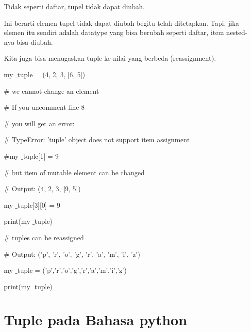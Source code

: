 Tidak seperti daftar, tupel tidak dapat diubah. \par
\vspace{12pt}
Ini berarti elemen tupel tidak dapat diubah begitu telah ditetapkan. Tapi, jika elemen itu sendiri adalah datatype yang bisa berubah seperti daftar, item nested-nya bisa diubah. \par
\vspace{12pt}
Kita juga bisa menugaskan tuple ke nilai yang berbeda (reassignment). \par
\vspace{12pt}
my $  \_  $tuple = (4, 2, 3, [6, 5]) \par
\vspace{12pt}
 $  \#  $ we cannot change an element \par
 $  \#  $ If you uncomment line 8 \par
 $  \#  $ you will get an error: \par
 $  \#  $ TypeError: 'tuple' object does not support item assignment \par
\vspace{12pt}
 $  \#  $my $  \_  $tuple[1] = 9 \par
\vspace{12pt}
 $  \#  $ but item of mutable element can be changed \par
 $  \#  $ Output: (4, 2, 3, [9, 5]) \par
my $  \_  $tuple[3][0] = 9 \par
print(my $  \_  $tuple) \par
\vspace{12pt}
 $  \#  $ tuples can be reassigned \par
 $  \#  $ Output: ('p', 'r', 'o', 'g', 'r', 'a', 'm', 'i', 'z') \par
my $  \_  $tuple = ('p','r','o','g','r','a','m','i','z') \par
print(my $  \_  $tuple) \par
\section {Tuple pada Bahasa python}

